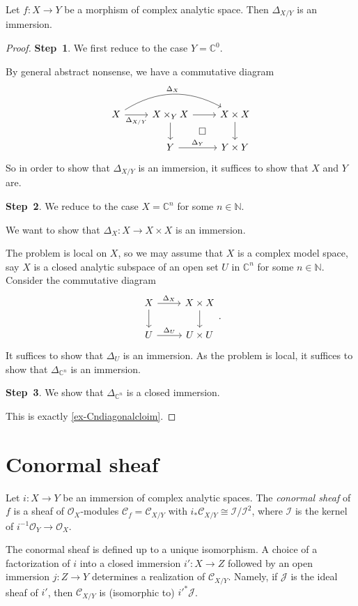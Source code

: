 \begin{proposition}
    Let $f:X\rightarrow Y$ be a morphism of complex analytic space. Then $\Delta_{X/Y}$ is an immersion.
\end{proposition}
\begin{proof}
    \textbf{Step~1}.    We first reduce to the case $Y=\mathbb{C}^0$.

    By general abstract nonsense, we have a commutative diagram
    \[
        \begin{tikzcd}
            X \arrow[r, "\Delta_{X/Y}"'] \arrow[rr, "\Delta_X", bend left] & X\times_Y X \arrow[d] \arrow[r] \arrow[rd, "\square", phantom] & X\times X \arrow[d] \\
                                                                           & Y \arrow[r, "\Delta_Y"]                                        & Y\times Y          
        \end{tikzcd}  
    \]
    So in order to show that $\Delta_{X/Y}$ is an immersion, it suffices to show that $X$ and $Y$ are.

    \textbf{Step~2}. We reduce to the case $X=\mathbb{C}^n$ for some $n\in \mathbb{N}$.
    
    We want to show that $\Delta_X:X\rightarrow X\times X$ is an immersion.

    The problem is local on $X$, so we may assume that $X$ is a complex model space, say $X$ is a closed analytic subspace of an open set $U$ in $\mathbb{C}^n$ for some $n\in \mathbb{N}$.
    Consider the commutative diagram
    \[
        \begin{tikzcd}
            X \arrow[r, "\Delta_X"] \arrow[d] & X\times X \arrow[d] \\
            U \arrow[r, "\Delta_U"]           & U\times U          
        \end{tikzcd}.  
    \]
    It suffices to show that $\Delta_U$ is an immersion. 
    As the problem is local, it suffices to show that $\Delta_{\mathbb{C}^n}$ is an immersion.

    \textbf{Step~3}. We show that $\Delta_{\mathbb{C}^n}$ is a closed immersion.

    This is exactly \cref{ex-Cndiagonalcloim}.
\end{proof}


\section{Conormal sheaf}
\begin{definition}
    Let $i:X\rightarrow Y$ be an immersion of complex analytic spaces. The \emph{conormal sheaf} of $f$ is a sheaf of $\mathcal{O}_X$-modules $\mathcal{C}_f=\mathcal{C}_{X/Y}$ with $i_*\mathcal{C}_{X/Y}\cong \mathcal{I}/\mathcal{I}^2$, where $\mathcal{I}$ is the kernel of $i^{-1}\mathcal{O}_Y\rightarrow \mathcal{O}_X$.
\end{definition}
The conormal sheaf is defined up to a unique isomorphism. A choice of a factorization of $i$ into a closed immersion $i':X\rightarrow Z$ followed by an open immersion $j:Z\rightarrow Y$ determines a realization of $\mathcal{C}_{X/Y}$. Namely, if $\mathcal{J}$ is the ideal sheaf of $i'$, then $\mathcal{C}_{X/Y}$ is (isomorphic to) $i'^{*}\mathcal{J}$.


